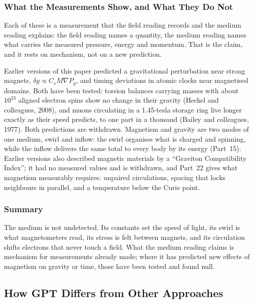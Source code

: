 \documentclass[12pt, a4paper]{article}
\begin{document}
\subsubsection{What the Measurements Show, and What They Do Not}

Each of these is a measurement that the field reading records and the medium reading explains: the field reading names a quantity, the medium reading names what carries the measured pressure, energy and momentum. That is the claim, and it rests on mechanism, not on a new prediction.

 Earlier versions of this paper predicted a gravitational perturbation near strong magnets, \( \delta g \propto C_s M \nabla P_g \), and timing deviations in atomic clocks near magnetised domains. Both have been tested: torsion balances carrying masses with about \( 10^{23} \) aligned electron spins show no change in their gravity (Heckel and colleagues, 2008), and muons circulating in a 1.45-tesla storage ring live longer exactly as their speed predicts, to one part in a thousand (Bailey and colleagues, 1977). Both predictions are withdrawn. Magnetism and gravity are two modes of one medium, swirl and inflow: the swirl organises what is charged and spinning, while the inflow delivers the same total to every body by its energy (Part~15). Earlier versions also described magnetic materials by a ``Graviton Compatibility Index''; it had no measured values and is withdrawn, and Part~22 gives what magnetism measurably requires: unpaired circulations, spacing that locks neighbours in parallel, and a temperature below the Curie point.

\subsubsection{Summary}

The medium is not undetected. Its constants set the speed of light, its swirl is what magnetometers read, its stress is felt between magnets, and its circulation shifts electrons that never touch a field. What the medium reading claims is mechanism for measurements already made; where it has predicted new effects of magnetism on gravity or time, those have been tested and found null.

\subsection{How GPT Differs from Other Approaches}
\label{subsec:GPT_comparison}
\end{document}
